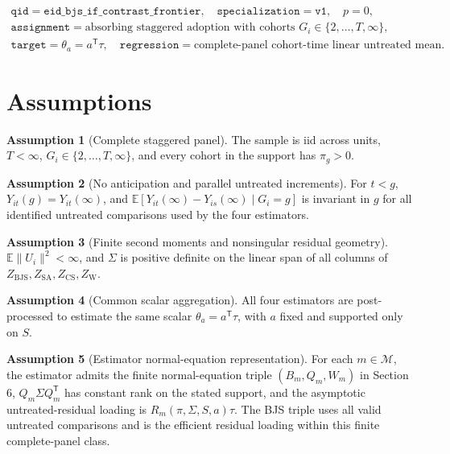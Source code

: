 \documentclass[11pt]{article}
\newcommand{\E}{\mathbb{E}}
\newcommand{\transpose}{\mathsf{T}}
\theoremstyle{definition}
\newtheorem{assumption}{Assumption}
\theoremstyle{plain}
\theoremstyle{remark}
\begin{document}
\[
\begin{gathered}
\texttt{qid}=\texttt{eid\_bjs\_if\_contrast\_frontier},\quad
\texttt{specialization}=\texttt{v1},\quad p=0,\\
\texttt{assignment}=\text{absorbing staggered adoption with cohorts }G_i\in\{2,\ldots,T,\infty\},\\
\texttt{target}=\theta_a=a^\transpose\tau,\quad
\texttt{regression}=\text{complete-panel cohort-time linear untreated mean.}
\end{gathered}
\]

\section{Assumptions}
\begin{assumption}[Complete staggered panel]\label{ass:complete}
The sample is iid across units, \(T<\infty\), \(G_i\in\{2,\ldots,T,\infty\}\), and
every cohort in the support has \(\pi_g>0\).
\end{assumption}

\begin{assumption}[No anticipation and parallel untreated increments]\label{ass:parallel}
For \(t<g\), \(Y_{it}(g)=Y_{it}(\infty)\), and
\(\E[Y_{it}(\infty)-Y_{is}(\infty)\mid G_i=g]\) is invariant in \(g\) for all
identified untreated comparisons used by the four estimators.
\end{assumption}

\begin{assumption}[Finite second moments and nonsingular residual geometry]\label{ass:sigma}
\(\E\|U_i\|^2<\infty\), and \(\Sigma\) is positive definite on the linear span of
all columns of \(Z_{\mathrm{BJS}},Z_{\mathrm{SA}},Z_{\mathrm{CS}},Z_{\mathrm{W}}\).
\end{assumption}

\begin{assumption}[Common scalar aggregation]\label{ass:target}
All four estimators are post-processed to estimate the same scalar
\(\theta_a=a^\transpose\tau\), with \(a\) fixed and supported only on \(S\).
\end{assumption}

\begin{assumption}[Estimator normal-equation representation]\label{ass:loading}
For each \(m\in\mathcal M\), the estimator admits the finite normal-equation
triple \((B_m,Q_m,W_m)\) in Section 6, \(Q_m\Sigma Q_m^\transpose\) has constant
rank on the stated support, and the asymptotic untreated-residual loading is
\(R_m(\pi,\Sigma,S,a)\tau\). The BJS triple uses all valid untreated comparisons
and is the efficient residual loading within this finite complete-panel class.
\end{assumption}
\end{document}
